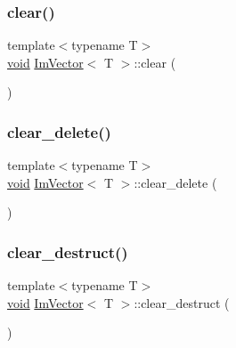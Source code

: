 \mbox{\label{structImVector_ae2d401b4ec5f1113cdb8edb5a61a38f7}} 
\subsubsection{\texorpdfstring{clear()}{clear()}}
{\footnotesize\ttfamily template$<$typename T$>$ \\
\hyperlink{imgui__impl__opengl3__loader_8h_ac668e7cffd9e2e9cfee428b9b2f34fa7}{void} \hyperlink{structImVector}{Im\+Vector}$<$ T $>$\+::clear (\begin{DoxyParamCaption}{ }\end{DoxyParamCaption})\hspace{0.3cm}{\ttfamily [inline]}}

\mbox{\label{structImVector_aed9c986ef3cd59fabbd89355d0023122}} 
\subsubsection{\texorpdfstring{clear\+\_\+delete()}{clear\_delete()}}
{\footnotesize\ttfamily template$<$typename T$>$ \\
\hyperlink{imgui__impl__opengl3__loader_8h_ac668e7cffd9e2e9cfee428b9b2f34fa7}{void} \hyperlink{structImVector}{Im\+Vector}$<$ T $>$\+::clear\+\_\+delete (\begin{DoxyParamCaption}{ }\end{DoxyParamCaption})\hspace{0.3cm}{\ttfamily [inline]}}

\mbox{\label{structImVector_ac1ed34eac753156e87e8a92f78dbbe3f}} 
\subsubsection{\texorpdfstring{clear\+\_\+destruct()}{clear\_destruct()}}
{\footnotesize\ttfamily template$<$typename T$>$ \\
\hyperlink{imgui__impl__opengl3__loader_8h_ac668e7cffd9e2e9cfee428b9b2f34fa7}{void} \hyperlink{structImVector}{Im\+Vector}$<$ T $>$\+::clear\+\_\+destruct (\begin{DoxyParamCaption}{ }\end{DoxyParamCaption})\hspace{0.3cm}{\ttfamily [inline]}}

